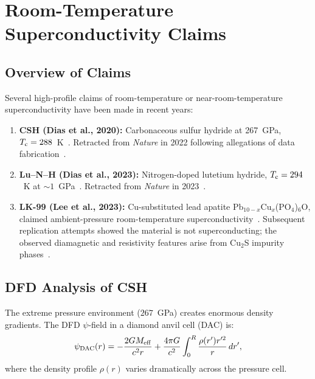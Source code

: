 \documentclass[aps,prb,twocolumn,superscriptaddress,floatfix,nofootinbib,longbibliography]{revtex4-2}
\newcommand{\Tc}{T_{\rm c}}
\begin{document}
\section{Room-Temperature Superconductivity Claims}\label{sec:roomT}

\subsection{Overview of Claims}

Several high-profile claims of room-temperature or near-room-temperature
superconductivity have been made in recent years:

\begin{enumerate}[nosep]
\item \textbf{CSH (Dias et al., 2020):} Carbonaceous sulfur hydride at
  267~GPa, $\Tc = 288$~K~\cite{Snider2020}.  Retracted from
  \textit{Nature} in 2022 following allegations of data
  fabrication~\cite{Snider2022retraction}.
\item \textbf{Lu--N--H (Dias et al., 2023):} Nitrogen-doped lutetium
  hydride, $\Tc = 294$~K at $\sim 1$~GPa~\cite{Dasenbrock2023}.
  Retracted from \textit{Nature} in 2023~\cite{Dias2023retraction}.
\item \textbf{LK-99 (Lee et al., 2023):} Cu-substituted lead apatite
  Pb$_{10-x}$Cu$_x$(PO$_4$)$_6$O, claimed ambient-pressure
  room-temperature superconductivity~\cite{Lee2023LK99,Lee2023LK99b}.
  Subsequent replication attempts showed the material is not
  superconducting; the observed diamagnetic and resistivity features
  arise from Cu$_2$S impurity
  phases~\cite{Guo2023,Liu2023LK99,Puphal2023}.
\end{enumerate}

\subsection{DFD Analysis of CSH}

The extreme pressure environment ($267$~GPa) creates enormous density
gradients.  The DFD $\psi$-field in a diamond anvil cell (DAC) is:
\begin{equation}
\psi_{\rm DAC}(r) = -\frac{2GM_{\rm eff}}{c^2 r}
+ \frac{4\pi G}{c^2}\int_0^R \frac{\rho(r')r'^2}{r}\,dr',
\label{eq:psi-dac}
\end{equation}
where the density profile $\rho(r)$ varies dramatically across the
pressure cell.
\end{document}
